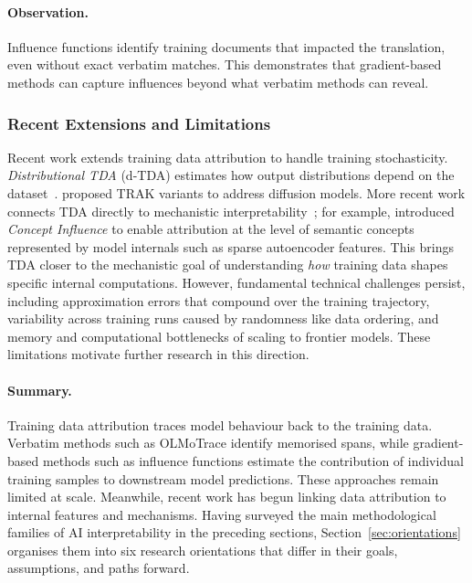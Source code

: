 \begin{examplebox}
\begin{quote}
\end{quote}

\paragraph{Observation.} Influence functions identify training documents that impacted the translation, even without exact verbatim matches. This demonstrates that gradient-based methods can capture influences beyond what verbatim methods can reveal.

\end{examplebox}

\subsubsection{Recent Extensions and Limitations}

Recent work extends training data attribution to handle training stochasticity. \emph{Distributional TDA} (d-TDA) estimates how output distributions depend on the dataset~.  proposed TRAK variants to address diffusion models. More recent work connects TDA directly to mechanistic interpretability~; for example,  introduced \emph{Concept Influence} to enable attribution at the level of semantic concepts represented by model internals such as sparse autoencoder features. This brings TDA closer to the mechanistic goal of understanding \emph{how} training data shapes specific internal computations. However, fundamental technical challenges persist, including approximation errors that compound over the training trajectory, variability across training runs caused by randomness like data ordering, and memory and computational bottlenecks of scaling to frontier models. These limitations motivate further research in this direction.

\paragraph{Summary.} 
Training data attribution traces model behaviour back to the training data. Verbatim methods such as OLMoTrace identify memorised spans, while gradient-based methods such as influence functions estimate the contribution of individual training samples to downstream model predictions. These approaches remain limited at scale. Meanwhile, recent work has begun linking data attribution to internal features and mechanisms. Having surveyed the main methodological families of AI interpretability in the preceding sections, Section~\ref{sec:orientations} organises them into six research orientations that differ in their goals, assumptions, and paths forward.
